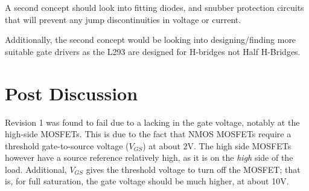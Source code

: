 \documentclass[a4paper]{article}
\begin{document}
A second concept should look into fitting diodes, and snubber protection
circuits that will prevent any jump discontinuities in voltage or current.

Additionally, the second concept would be looking into designing/finding more
suitable gate drivers as the L293 are designed for H-bridges not Half H-Bridges.

\section{Post Discussion}
Revision 1 was found to fail due to a lacking in the gate voltage, notably at
the high-side MOSFETs. This is due to the fact that NMOS MOSFETs require a
threshold gate-to-source voltage ($V_{GS}$) at about 2V. The high side MOSFETs
however have a source reference relatively high, as it is on the \textit{high}
side of the load. Additional, $V_{GS}$ gives the threshold voltage to turn off
the MOSFET; that is, for full saturation, the gate voltage should be much
higher, at about 10V.
\end{document}
